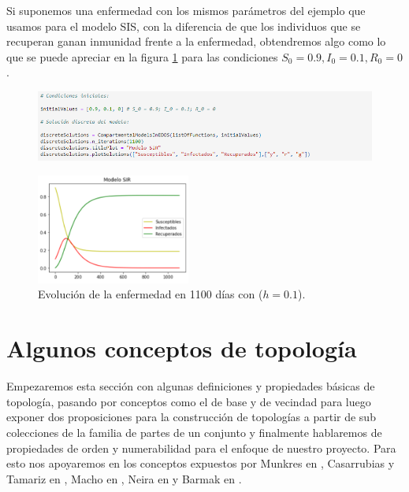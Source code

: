 Si suponemos una enfermedad con los mismos parámetros del ejemplo que usamos para el modelo SIS, con la diferencia de que los individuos que se recuperan ganan inmunidad frente a la enfermedad, obtendremos algo como lo que se puede apreciar en la figura \ref{fig:Ejemplo 2 - SIR} para las condiciones $S_0=0.9,I_0=0.1,R_0=0$.

\begin{figure}[h]
  \centering
    \includegraphics[width=1\textwidth]{Imagenes/compartimentalModels4.png}
\end{figure}

\begin{figure}[h]
  \centering
    \includegraphics[width=0.45\textwidth]{Imagenes/ex1SIR.PNG}
  \caption{\centering Evolución de la enfermedad en 1100 días con ($h=0.1$).}
  \label{fig:Ejemplo 2 - SIR}
\end{figure}

\newpage

\section{Algunos conceptos de topología}\label{sec:NocionesTopología}

Empezaremos esta sección con algunas definiciones y propiedades básicas de topología, pasando por conceptos como el de base y de vecindad para luego exponer dos proposiciones para la construcción de topologías a partir de sub colecciones de la familia de partes de un conjunto y finalmente hablaremos de propiedades de orden y numerabilidad para el enfoque de nuestro proyecto. Para esto nos apoyaremos en los conceptos expuestos por Munkres en \cite{munkres}, Casarrubias y Tamariz en \cite{elementosTopologiaGeneral}, Macho en \cite{stadler2002}, Neira en \cite{NeiraNacional} y Barmak en \cite{barmak2011}.

